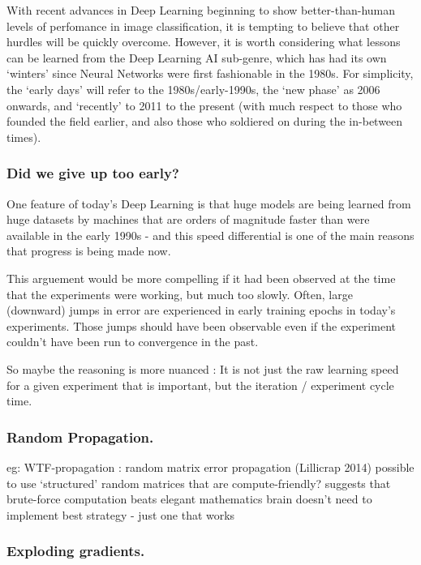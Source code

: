 \documentclass[citeauthoryear]{llncs}
\begin{document}
With recent advances in Deep Learning beginning to show better-than-human 
levels of perfomance in image classification, it is tempting to believe 
that other hurdles will be quickly overcome.  However, it is worth considering
what lessons can be learned from the Deep Learning AI sub-genre, which has 
had its own `winters' since Neural Networks were first fashionable in 
the 1980s.  For simplicity, the `early days' will refer to the 1980s/early-1990s,
the `new phase' as 2006 onwards, and `recently' to 2011 to the present 
(with much respect to those who founded the field earlier, and also 
those who soldiered on during the in-between times).



\subsubsection*{Did we give up too early?}
 
One feature of today's Deep Learning is that huge models are being learned
from huge datasets by machines that are orders of magnitude faster than 
were available in the early 1990s - and this speed differential is one of the 
main reasons that progress is being made now.

This arguement would be more compelling if it had been observed at the time 
that the experiments were working, but much too slowly.  Often, large (downward)
jumps in error are experienced in early training epochs in today's experiments.  
Those jumps should have been observable even if the experiment couldn't have 
been run to convergence in the past.  

So maybe the reasoning is more nuanced : It is not just the raw learning speed 
for a given experiment that is important, but the iteration / experiment cycle time.



\subsubsection*{Random Propagation.}
    eg: WTF-propagation : random matrix error propagation (Lillicrap 2014)
      possible to use `structured' random matrices that are compute-friendly?
      suggests that brute-force computation beats elegant mathematics
        brain doesn't need to implement best strategy - just one that works


\subsubsection*{Exploding gradients.}
\end{document}
